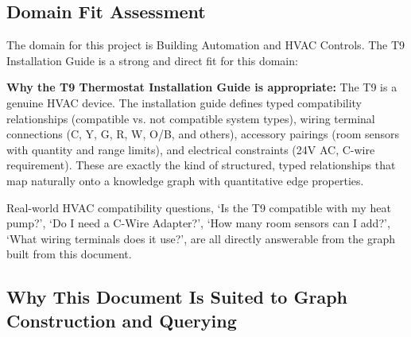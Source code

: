 \documentclass[11pt,a4paper]{article}
\begin{document}
\subsection{Domain Fit Assessment}
The domain for this project is Building Automation and HVAC Controls. The T9 Installation Guide is a strong and direct fit for this domain:

\textbf{Why the T9 Thermostat Installation Guide is appropriate:}
The T9 is a genuine HVAC device. The installation guide defines typed compatibility relationships (compatible vs. not compatible system types), wiring terminal connections (C, Y, G, R, W, O/B, and others), accessory pairings (room sensors with quantity and range limits), and electrical constraints (24V AC, C-wire requirement). These are exactly the kind of structured, typed relationships that map naturally onto a knowledge graph with quantitative edge properties.

Real-world HVAC compatibility questions, `Is the T9 compatible with my heat pump?', `Do I need a C-Wire Adapter?', `How many room sensors can I add?', `What wiring terminals does it use?', are all directly answerable from the graph built from this document.

\subsection{Why This Document Is Suited to Graph Construction and Querying}
\end{document}
